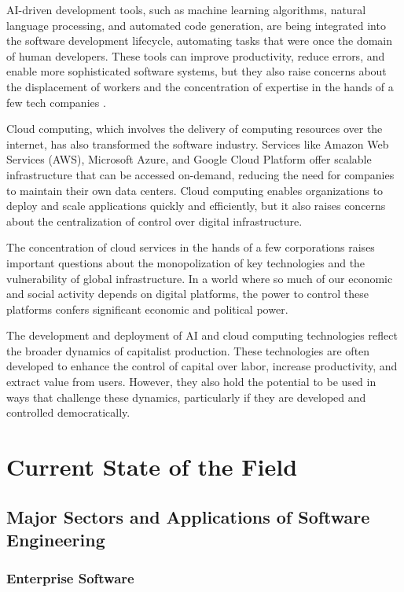\begin{refsection}
\begin{multicols}{2}
{AI-driven development tools, such as machine learning algorithms, natural language processing, and automated code generation, are being integrated into the software development lifecycle, automating tasks that were once the domain of human developers. These tools can improve productivity, reduce errors, and enable more sophisticated software systems, but they also raise concerns about the displacement of workers and the concentration of expertise in the hands of a few tech companies \cite[p. 56]{crawford2018}.

Cloud computing, which involves the delivery of computing resources over the internet, has also transformed the software industry. Services like Amazon Web Services (AWS), Microsoft Azure, and Google Cloud Platform offer scalable infrastructure that can be accessed on-demand, reducing the need for companies to maintain their own data centers. Cloud computing enables organizations to deploy and scale applications quickly and efficiently, but it also raises concerns about the centralization of control over digital infrastructure.

The concentration of cloud services in the hands of a few corporations raises important questions about the monopolization of key technologies and the vulnerability of global infrastructure. In a world where so much of our economic and social activity depends on digital platforms, the power to control these platforms confers significant economic and political power.

The development and deployment of AI and cloud computing technologies reflect the broader dynamics of capitalist production. These technologies are often developed to enhance the control of capital over labor, increase productivity, and extract value from users. However, they also hold the potential to be used in ways that challenge these dynamics, particularly if they are developed and controlled democratically.
}
\newpage
\end{multicols}
\section{Current State of the Field}
\begin{multicols}{2}
{\small
\subsection{Major Sectors and Applications of Software Engineering}

\subsubsection{Enterprise Software}

}
\end{multicols}
\end{refsection}
